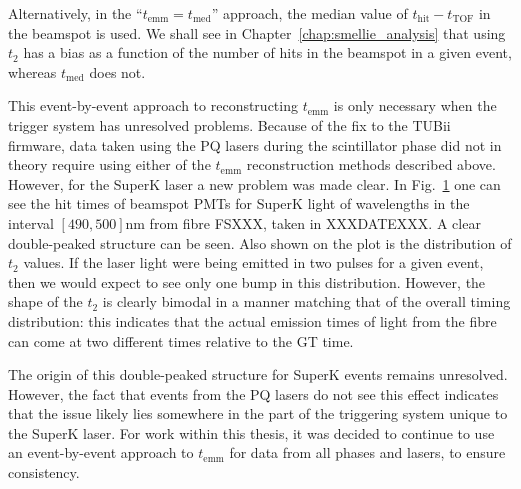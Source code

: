Alternatively, in the ``$t_{\mathrm{emm}} = t_{\mathrm{med}}$'' approach, the median value of $t_{\mathrm{hit}}-t_{\mathrm{TOF}}$ in the beamspot is used. We shall see in Chapter~\ref{chap:smellie_analysis} that using $t_{2}$ has a bias as a function of the number of hits in the beamspot in a given event, whereas $t_{\mathrm{med}}$ does not.

This event-by-event approach to reconstructing $t_{\mathrm{emm}}$ is only necessary when the trigger system has unresolved problems. Because of the fix to the TUBii firmware, data taken using the PQ lasers during the scintillator phase did not in theory require using either of the $t_{\mathrm{emm}}$ reconstruction methods described above. However, for the SuperK laser a new problem was made clear. In Fig.~\ref{fig:smellie_superk_double_peaks} one can see the hit times of beamspot PMTs for SuperK light of wavelengths in the interval $[490,500]\si{\nm}$ from fibre FSXXX, taken in XXXDATEXXX. %
A clear double-peaked structure can be seen. Also shown on the plot is the distribution of $t_{2}$ values. If the laser light were being emitted in two pulses for a given event, then we would expect to see only one bump in this distribution. However, the shape of the $t_{2}$ is clearly bimodal in a manner matching that of the overall timing distribution: this indicates that the actual emission times of light from the fibre can come at two different times relative to the GT time.

\begin{figure}
    \centering
    \caption[]{}
    \label{fig:smellie_superk_double_peaks}
\end{figure}

The origin of this double-peaked structure for SuperK events remains unresolved. However, the fact that events from the PQ lasers do not see this effect indicates that the issue likely lies somewhere in the part of the triggering system unique to the SuperK laser. For work within this thesis, it was decided to continue to use an event-by-event approach to $t_{\mathrm{emm}}$ for data from all phases and lasers, to ensure consistency.


